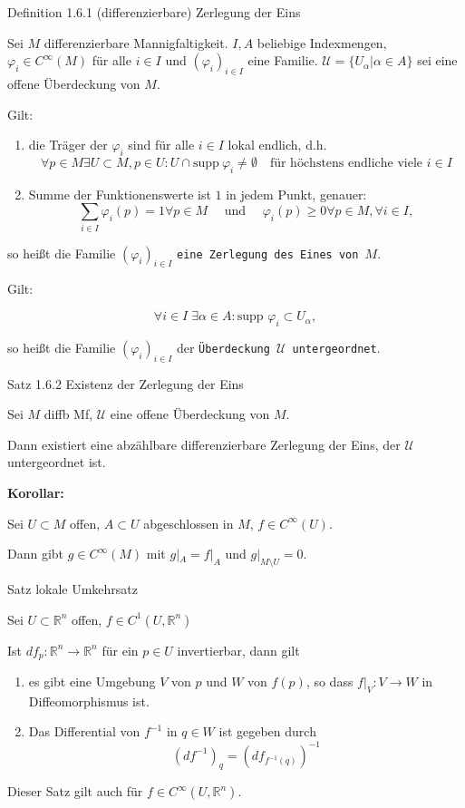 \documentclass[a6paper,11pt,grid=front]{kartei}
\newcommand{\fl}[1]{\begin{flushleft}
 #1 \end{flushleft}}
\newcommand{\R}{\mathbb{R}}
\newcounter{satz}
\begin{document}
\nonameyet
{\scriptsize Definition 1.6.1} {\footnotesize (differenzierbare) Zerlegung der Eins}
{
	\scriptsize
Sei $M$ differenzierbare Mannigfaltigkeit. $I,A$ beliebige Indexmengen,
$\varphi_i \in C^\infty(M)$ für alle $i\in I$ und $(\varphi_i)_{i\in I}$ 
eine Familie. $\mathcal{U} = \{U_\alpha | \alpha \in A\}$ sei eine offene 
Überdeckung von $M$.
\fl{Gilt: }
\begin{enumerate}[1.]
\item die Träger der $\varphi_i$ sind für alle $i\in I$ lokal endlich, d.h.
\[
\forall p\in M \exists U\subset M, p\in U: U \cap \text{supp}\:\varphi_i \neq \emptyset
\quad \text{für höchstens endliche viele $i \in I$}
\]
\item Summe der Funktionenswerte ist $1$ in jedem Punkt, genauer:
\[
\sum_{i\in I} \varphi_i(p) = 1 \forall p\in M 
\quad \text{ und } \quad
\varphi_i(p) \geq 0 \forall p\in M,\forall i \in I,
\]
\end{enumerate}
\fl{so heißt die Familie $(\varphi_i)_{i\in I}$ 
\texttt{eine Zerlegung des Eines von $M$}.}
%
\fl{Gilt:}
\[
\forall i \in I \; \exists \alpha \in A: \text{supp }\varphi_i \subset U_\alpha,
\]
\fl{so heißt die Familie $(\varphi_i)_{i\in I}$ der \texttt{Überdeckung 
$\mathcal{U}$ untergeordnet}.}
}
{}

\nonameyet
{Satz 1.6.2} {Existenz der Zerlegung der Eins}
{
	\small
Sei $M$ diffb Mf, $\mathcal{U}$ eine offene Überdeckung von $M$.
\fl{Dann existiert eine abzählbare differenzierbare Zerlegung der Eins,
der $\mathcal{U}$ untergeordnet ist.}
\fl{\textbf{Korollar:}} 
Sei $U \subset M$ offen, $A \subset U$ abgeschlossen in $M$, $f\in C^\infty(U)$.
\fl{Dann gibt $g\in C^\infty(M)$ mit $g|_A = f|_A$ und $g|_{M\setminus U} = 0$.}
}
{}

\nonameyet
{Satz} {lokale Umkehrsatz}
{
Sei $U\subset \R^n$ offen, $f\in C^1(U,\R^n)$
\fl{Ist $df_p : \R^n \to \R^n$ für ein $p \in U$ invertierbar, dann gilt}
\begin{enumerate}[1.]
\item es gibt eine Umgebung $V$ von $p$ und $W$ von $f(p)$, 
so dass $f|_V : V \to W$ in Diffeomorphismus ist. 
\item Das Differential von $f^ {-1}$ in $q \in W$ ist gegeben durch
\[
(df^{-1})_q = (df_{f^{-1}(q)})^{-1}
\]
\end{enumerate}
Dieser Satz gilt auch für $f\in C^\infty(U,\R^n)$.
}
{}
\end{document}
